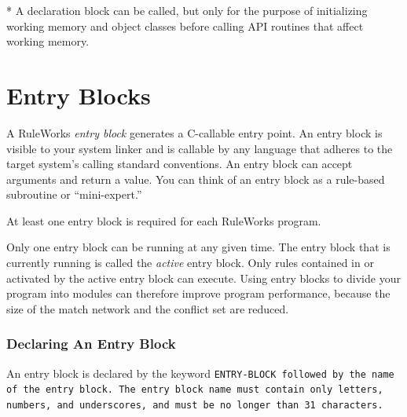 * A declaration block can be called, but only for the purpose of
initializing working memory and object classes before calling API
routines that affect working memory.

\section{Entry Blocks}

A RuleWorks \emph{entry block} generates a C-callable entry point. An
entry block is visible to your system linker and is callable by any
language that adheres to the target system's calling standard
conventions. An entry block can accept arguments and return a
value. You can think of an entry block as a rule-based subroutine or
``mini-expert.''

At least one entry block is required for each RuleWorks program.

Only one entry block can be running at any given time. The entry block
that is currently running is called the \emph{active} entry
block. Only rules contained in or activated by the active entry block
can execute. Using entry blocks to divide your program into modules
can therefore improve program performance, because the size of the
match network and the conflict set are reduced.

\subsubsection{Declaring An Entry Block}

An entry block is declared by the keyword \tt{ENTRY-BLOCK} followed by
the name of the entry block. The entry block name must contain only
letters, numbers, and underscores, and must be no longer than 31
characters.

